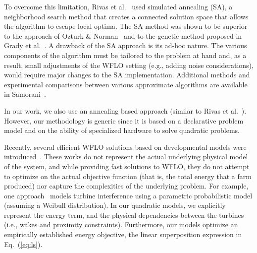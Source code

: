\documentclass[preprint,12pt]{elsarticle}
\newcommand{\todo}[1]{{\textcolor{red}{\bf {#1}}}}
\begin{document}
To overcome this limitation, Rivas et al.\ \cite{rivas2009solving} used simulated annealing (SA), 
a neighborhood search method that creates a connected solution space that allows the algorithm to escape 
local optima. The SA method was shown to be superior to the approach of Ozturk \& Norman~\cite{ozturk2004heuristic} 
and to the genetic method proposed in Grady et al.\ \cite{grady2005placement}. A drawback of the SA approach 
is its ad-hoc nature. The various components of the algorithm
 must be tailored to the problem at hand and, as a result, small adjustments of the WFLO setting
 (e.g., adding noise considerations), would require major changes to the SA implementation. 
Additional methods and experimental comparisons between various approximate algorithms are available in Samorani~\cite{samorani2013wind}.

In our work, we also use an annealing based approach (similar to Rivas et al.\ \cite{rivas2009solving}). However,
our methodology is generic since it is based on a declarative problem model and
on the ability of specialized hardware to solve %
quadratic problems.


Recently, several efficient WFLO solutions based on developmental models were introduced~\cite{wilson2013learning,wilson2014continuous}. These works do not represent the actual underlying physical model of the system, and while providing fast solutions to WFLO,
they do not attempt to optimize on the actual objective function (that is, the total energy that a farm produced) nor capture the complexities of the underlying problem. For example, one approach~\cite{wilson2013learning} models turbine interference using a parametric probabilistic model (assuming a Weibull distribution). In our quadratic models, we explicitly represent the energy term, and the physical dependencies between the turbines (i.e., wakes and proximity constraints). Furthermore, our models
optimize an empirically established energy objective, the linear superposition expression in Eq.~(\ref{eq:ls}).

\end{document}
